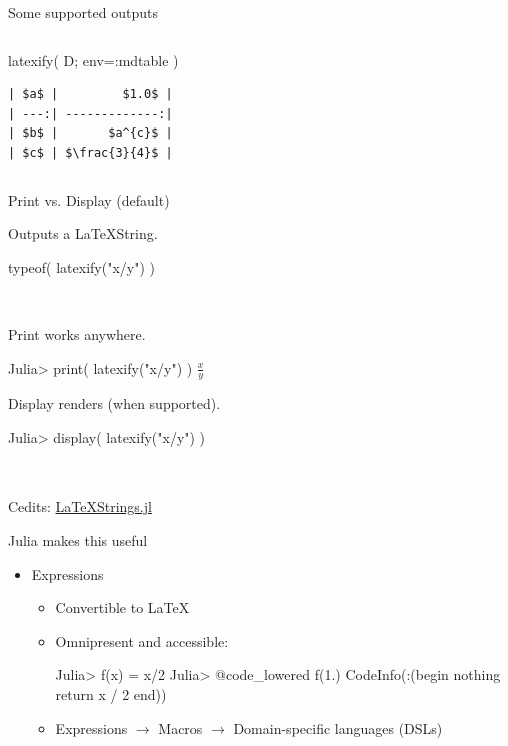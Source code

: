\documentclass{beamer}
\begin{document}
\begin{frame}[fragile]{Some supported outputs}
\begin{columns}[t]
\begin{column}{0.5\textwidth}
\begin{juliacode}
  latexify( D; env=:mdtable )
\end{juliacode}
  \footnotesize
\begin{verbatim}
| $a$ |         $1.0$ |
| ---:| -------------:|
| $b$ |       $a^{c}$ |
| $c$ | $\frac{3}{4}$ |
\end{verbatim}
\vfill
\end{column}
\end{columns}

\end{frame}


\begin{frame}[fragile]{Print vs. Display (default)}

  \textbullet Outputs a LaTeXString.
  \begin{juliacode}
    typeof( latexify("x/y") )

    ~\large\textcolor{white}{\tiny LaTeXStrings.LaTeXString}~
  \end{juliacode}

  \textbullet Print works anywhere.
  \begin{juliacode}
    Julia> print( latexify("x/y") )
    $\frac{x}{y}$
  \end{juliacode}

  \textbullet Display renders (when supported).
  \begin{juliacode}
    Julia> display( latexify("x/y") )

    ~\large\textcolor{white}{$\frac{x}{y}$}~
  \end{juliacode}


  Cedits: \href{https://github.com/stevengj/LaTeXStrings.jl}{LaTeXStrings.jl}


\end{frame}

\begin{frame}[fragile]{Julia makes this useful}
  \begin{itemize}
    \setlength{\itemsep}{3mm}
    \item Expressions
    \begin{itemize}
    \setlength{\itemsep}{3mm}
      \item Convertible to \LaTeX
      \item Omnipresent and accessible:
\begin{juliacode}
  Julia> f(x) = x/2
  Julia> @code_lowered f(1.)
  CodeInfo(:(begin
      nothing
      return x / 2
    end))
\end{juliacode}

\item Expressions $\to$ Macros $\to$ Domain-specific languages (DSLs)
    \end{itemize}

  \end{itemize}

\end{frame}
\end{document}
